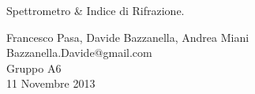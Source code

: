 \begin{center}

     	{\huge Spettrometro \& Indice di Rifrazione.}
	\vspace{0.5cm}

      	{\large Francesco Pasa, Davide Bazzanella, Andrea Miani} \\
      	{Bazzanella.Davide@gmail.com} \\
		{\large Gruppo A6} \\
	
	\vspace{0.3cm}
      	{\large 11 Novembre 2013}

\end{center}
